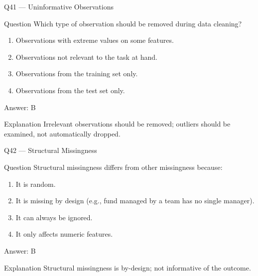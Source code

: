 \documentclass[aspectratio=169,8pt]{beamer}
\begin{document}
	\begin{frame}{Q41 --- Uninformative Observations}
		\begin{block}{Question}
			Which type of observation should be removed during data cleaning?
		\end{block}
		\begin{enumerate}
			\item Observations with extreme values on some features.
			\item Observations not relevant to the task at hand.
			\item Observations from the training set only.
			\item Observations from the test set only.
		\end{enumerate}
		\begin{exampleblock}{Answer: B}\end{exampleblock}
		\begin{block}{Explanation}
			Irrelevant observations should be removed; outliers should be examined, not automatically dropped.
		\end{block}
	\end{frame}
	
	\begin{frame}{Q42 --- Structural Missingness}
		\begin{block}{Question}
			Structural missingness differs from other missingness because:
		\end{block}
		\begin{enumerate}
			\item It is random.
			\item It is missing by design (e.g., fund managed by a team has no single manager).
			\item It can always be ignored.
			\item It only affects numeric features.
		\end{enumerate}
		\begin{exampleblock}{Answer: B}\end{exampleblock}
		\begin{block}{Explanation}
			Structural missingness is by-design; not informative of the outcome.
		\end{block}
	\end{frame}
	
\end{document}
